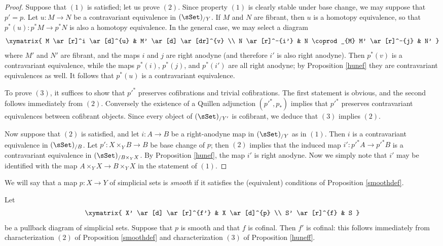 \begin{proof}
Suppose that $(1)$ is satisfied; let us prove $(2)$. Since property $(1)$ is clearly stable under base change, we may suppose that $p' = p$. Let $u: M \rightarrow N$ be a contravariant equivalence in
$(\sSet)_{/Y}$. If $M$ and $N$ are fibrant, then $u$ is a homotopy equivalence, so that $p^{\ast}(u): p^{\ast} M \rightarrow p^{\ast} N$ is also a homotopy equivalence. In the general case, we may select a diagram
$$ \xymatrix{ M \ar[r]^i \ar[d]^{u} & M' \ar[d] \ar[dr]^{v} \\
N \ar[r]^-{i'} & N \coprod_{M} M' \ar[r]^-{j} &  N' } $$
where $M'$ and $N'$ are fibrant, and the maps $i$ and $j$ are right anodyne (and therefore $i'$ is also right anodyne). Then $p^{\ast}(v)$ is a contravariant equivalence, while the maps
$p^{\ast}(i)$, $p^{\ast}(j)$, and $p^{\ast}(i')$ are all right anodyne; by Proposition \ref{hunef} they are contravariant equivalences as well. It follows that $p^{\ast}(u)$ is a contravariant equivalence.

To prove $(3)$, it suffices to show that ${p'}^{\ast}$ preserves cofibrations and trivial cofibrations. The first statement is obvious, and the second follows immediately from $(2)$. Conversely the existence of a Quillen adjunction $({p'}^{\ast}, p_{\ast})$ implies that ${p'}^{\ast}$ preserves contravariant equivalences between cofibrant objects. Since every object of $(\sSet)_{/Y'}$ is cofibrant, we deduce that $(3)$ implies $(2)$. 

Now suppose that $(2)$ is satisfied, and let $i: A \rightarrow B$ be a right-anodyne map in $(\sSet)_{/Y}$ as in $(1)$. Then $i$ is a contravariant equivalence in $(\sSet)_{/B}$. Let $p': X \times_{Y} B \rightarrow B$ be base change of $p$; then $(2)$ implies that the induced map
$i': {p'}^{\ast} A \rightarrow {p'}^{\ast} B$ is a contravariant equivalence in $(\sSet)_{/B \times_{Y} X}$. By Proposition \ref{hunef}, the map $i'$ is right anodyne. Now we simply note that $i'$ may be identified with the map $A \times_Y X \rightarrow B \times_{Y} X$ in the statement of $(1)$.
\end{proof}

\begin{definition}
We will say that a map $p: X \rightarrow Y$ of simplicial sets is {\em smooth} if it satisfies the (equivalent) conditions of Proposition \ref{smoothdef}.
\end{definition}

\begin{remark}\label{gonau}
Let 
$$ \xymatrix{ X' \ar[d] \ar[r]^{f'} & X \ar[d]^{p} \\
S' \ar[r]^{f} & S }$$
be a pullback diagram of simplicial sets. Suppose that $p$ is smooth and that $f$ is cofinal. Then $f'$ is cofinal: this follows immediately from characterization $(2)$ of Proposition \ref{smoothdef} and characterization $(3)$ of Proposition \ref{huneff}.
\end{remark}

